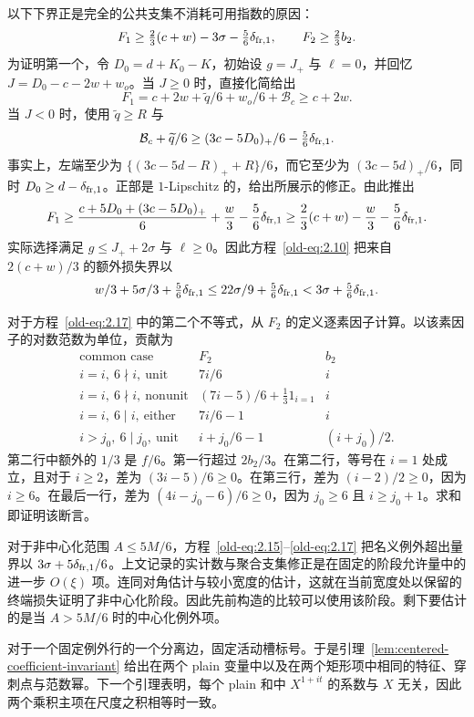 以下下界正是完全的公共支集不消耗可用指数的原因：
\begin{equation}
 F_1\ge\tfrac23(c+w)-3\sigma-\tfrac56\delta_{{\rm fr},1},\qquad
 F_2\ge\tfrac23b_2.
 \label{old-eq:2.17}
\end{equation}
为证明第一个，令 \(D_0=d+K_0-K\)，初始设 \(g=J_+\) 与 \(\ell=0\)，并回忆 \(J=D_0-c-2w+w_o\)。当 \(J\ge0\) 时，直接化简给出
\[
 F_1=c+2w+\widetilde q/6+w_o/6+\mathcal B_c
       \ge c+2w.
\]
当 \(J<0\) 时，使用 \(\widetilde q\ge R\) 与
\[
 \mathcal B_c+\widetilde q/6
 \ge (3c-5D_0)_+/6-\tfrac56\delta_{{\rm fr},1}.
\]
事实上，左端至少为 \(\{(3c-5d-R)_++R\}/6\)，而它至少为 \((3c-5d)_+/6\)，同时 \(D_0\ge d-\delta_{{\rm fr},1}\)。正部是 \(1\)-Lipschitz 的，给出所展示的修正。由此推出
\[
 F_1\ge
 \frac{c+5D_0+(3c-5D_0)_+}{6}+\frac w3
       -\frac56\delta_{{\rm fr},1}
 \ge\frac23(c+w)-\frac w3-\frac56\delta_{{\rm fr},1}.
\]
实际选择满足 \(g\le J_++2\sigma\) 与 \(\ell\ge0\)。因此方程~\eqref{old-eq:2.10} 把来自 \(2(c+w)/3\) 的额外损失界以
\[
 w/3+5\sigma/3+\tfrac56\delta_{{\rm fr},1}
 \le22\sigma/9+\tfrac56\delta_{{\rm fr},1}
 <3\sigma+\tfrac56\delta_{{\rm fr},1}.
\]

对于方程~\eqref{old-eq:2.17} 中的第二个不等式，从 \(F_2\) 的定义逐素因子计算。以该素因子的对数范数为单位，贡献为
\[
 \begin{array}{c|c|c}
 \text{common case}&F_2&b_2\\ \hline
 i=i,\ 6\nmid i,\ \text{unit}&7i/6&i\\
 i=i,\ 6\nmid i,\ \text{nonunit}
       &(7i-5)/6+\tfrac13 1_{i=1}&i\\
 i=i,\ 6\mid i,\ \text{either}&7i/6-1&i\\
 i>j_0,\ 6\mid j_0,\ \text{unit}
       &i+j_0/6-1&(i+j_0)/2 .
 \end{array}
\]
第二行中额外的 \(1/3\) 是 \(f/6\)。第一行超过 \(2b_2/3\)。在第二行，等号在 \(i=1\) 处成立，且对于 \(i\ge2\)，差为 \((3i-5)/6\ge0\)。在第三行，差为 \((i-2)/2\ge0\)，因为 \(i\ge6\)。在最后一行，差为 \((4i-j_0-6)/6\ge0\)，因为 \(j_0\ge6\) 且 \(i\ge j_0+1\)。求和即证明该断言。

对于非中心化范围 \(A\le5M/6\)，方程~\eqref{old-eq:2.15}--\eqref{old-eq:2.17} 把名义例外超出量界以 \(3\sigma+5\delta_{{\rm fr},1}/6\)。上文记录的实计数与聚合支集修正是在固定的阶段允许量中的进一步 \(O(\xi)\) 项。连同对角估计与较小宽度的估计，这就在当前宽度处以保留的终端损失证明了非中心化阶段。因此先前构造的比较可以使用该阶段。剩下要估计的是当 \(A>5M/6\) 时的中心化例外项。

对于一个固定例外行的一个分离边，固定活动槽标号。于是引理~\ref{lem:centered-coefficient-invariant} 给出在两个 plain 变量中以及在两个矩形项中相同的特征、穿刺点与范数幂。下一个引理表明，每个 plain 和中 \(X^{1+it}\) 的系数与 \(X\) 无关，因此两个乘积主项在尺度之积相等时一致。

